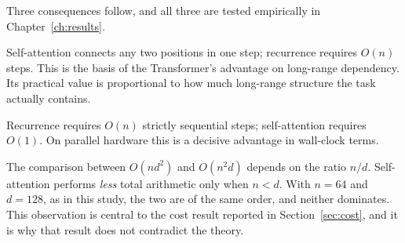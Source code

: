 Three consequences follow, and all three are tested empirically in Chapter~\ref{ch:results}.

 Self-attention connects any two positions in one step; recurrence requires
$O(n)$ steps. This is the basis of the Transformer's advantage on long-range dependency. Its
practical value is proportional to how much long-range structure the task actually contains.

 Recurrence requires $O(n)$ strictly sequential steps; self-attention
requires $O(1)$. On parallel hardware this is a decisive advantage in wall-clock terms.

 The comparison between $O(n d^2)$ and $O(n^2 d)$ depends on the ratio
$n/d$. Self-attention performs \emph{less} total arithmetic only when $n < d$. With $n = 64$ and
$d = 128$, as in this study, the two are of the same order, and neither dominates. This observation
is central to the cost result reported in Section~\ref{sec:cost}, and it is why that result does
not contradict the theory.

